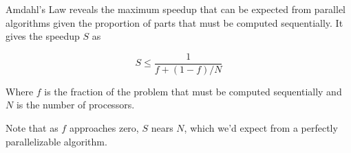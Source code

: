 \documentclass{article}
\begin{document}
Amdahl's Law reveals the maximum speedup that can be expected from parallel algorithms given the proportion of parts that must be computed sequentially.  It gives the speedup $S$ as

$$ S \le \frac{1}{f+(1-f)/N}  $$

Where $f$ is the fraction of the problem that must be computed sequentially and $N$ is the number of processors.

Note that as $f$ approaches zero, $S$ nears $N$, which we'd expect from a perfectly parallelizable algorithm.

\end{document}
